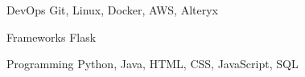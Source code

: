 

\begin{cvskills}


  \cvskill
    {DevOps} %
    {Git, Linux, Docker, AWS, Alteryx} %

  \cvskill
    {Frameworks} %
    {Flask} %

  \cvskill
    {Programming} %
    {Python, Java, HTML, CSS, JavaScript, SQL} %


\end{cvskills}
